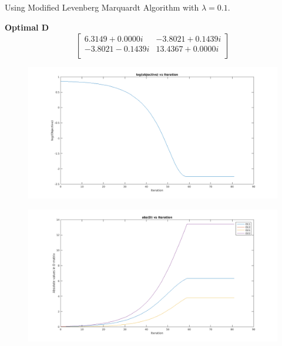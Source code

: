 \documentclass[11pt]{article}
\begin{document}
\maketitle

\subsection{}
Using Modified Levenberg Marquardt Algorithm with $\lambda = 0.1$.

\textbf{Optimal D}
\[\begin{bmatrix}
6.3149 + 0.0000i & -3.8021 + 0.1439i\\
-3.8021 - 0.1439i & 13.4367 + 0.0000i\\
\end{bmatrix}\]
\begin{figure}[h]
\centering
\includegraphics[scale=0.5]{obj}
\end{figure}

\begin{figure}[h]
\centering
\includegraphics[scale=0.5]{absd}
\end{figure}
\end{document}
